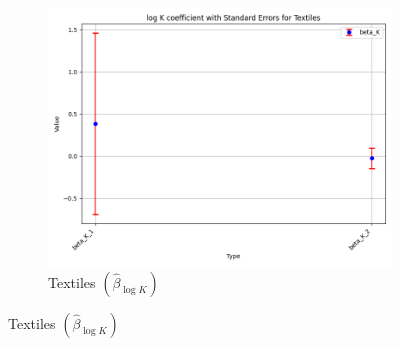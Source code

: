 \documentclass{article}
\begin{document}
\begin{figure}[ht!]
\begin{subfigure}[t]{0.32\textwidth}
        \centering
        \includegraphics[width=\textwidth]{figure/empirical_ar1_mixture_kmshare_ciiu_beta_logK_with_error_bars_Textiles.png}
        \caption{Textiles $(\hat{\beta}_{\log K})$}
    \end{subfigure}


\end{figure}
\end{document}
